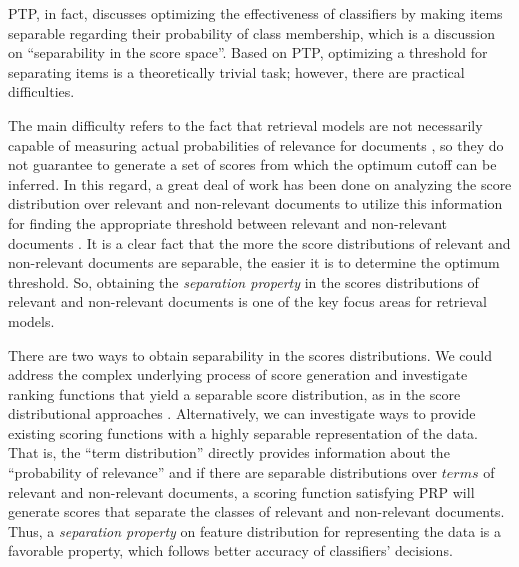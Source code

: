 PTP, in fact, discusses optimizing the effectiveness of classifiers by making items separable regarding their probability of class membership, which is a discussion on ``separability in the score space''. Based on PTP, optimizing a threshold for separating items is a theoretically trivial task; however, there are practical difficulties. 

The main difficulty refers to the fact that retrieval models are not necessarily capable of measuring actual probabilities of relevance for documents \citep{Arampatzis:2001}, so they do not guarantee to generate a set of scores from which the optimum cutoff can be inferred. 
In this regard, a great deal of work has been done on analyzing the score distribution over relevant and non-relevant documents to utilize this information for finding the appropriate threshold between relevant and non-relevant documents \citep{Kanoulas:2009,Arampatzis:2009,Arampatzis:2001}. 
%
It is a clear fact that the more the score distributions of relevant and non-relevant documents are separable, the easier it is to determine the optimum threshold. 
So, obtaining the \emph{separation property} in the scores distributions of relevant and non-relevant documents is one of the key focus areas for retrieval models.

There are two ways to obtain separability in the scores distributions.  We could address the complex underlying process of score generation and investigate ranking functions that yield a separable score distribution, as in the score distributional approaches \citep[e.g.][]{Arampatzis:2001}.  Alternatively, we can investigate ways to provide existing scoring functions with a highly separable representation of the data. 
That is, the ``term distribution'' directly provides information about the ``probability of relevance'' \citep{Crestani:1998} and if there are separable distributions over $terms$ of relevant and non-relevant documents, a scoring function satisfying PRP will generate scores that separate the classes of relevant and non-relevant documents. 
Thus, a \emph{separation property} on feature distribution for representing the data is a favorable property, which follows better accuracy of classifiers' decisions.

